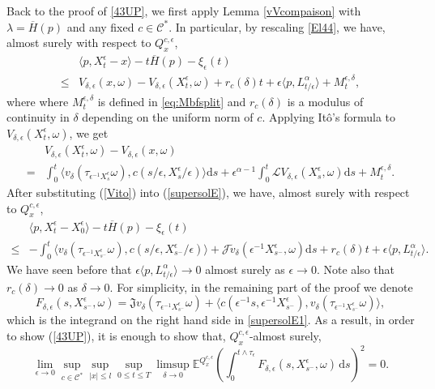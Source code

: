 \documentclass[11pt,reqno]{amsart}
\theoremstyle{definition}
\theoremstyle{remark}
\numberwithin{equation}{section}
\newcommand{\eps}{\epsilon}
\newcommand{\ol}{\overline}
\begin{document}
Back to the proof of \eqref{43UP}, we first apply Lemma \ref{vVcompaison} with $\lambda = \ol{H}(p)$ and any fixed $c\in \mathscr{C}^*$. In particular, by rescaling \eqref{El44},   we have, almost surely with respect to $Q^{c, \epsilon}_{x}$,
\begin{align}\label{supersolE}
   &  \langle p, X^{\epsilon}_{t} - x \rangle - t\overline{H}(p) - \xi_{\epsilon}(t) \nonumber\\
    \leq & V_{\delta,\epsilon}(x,\omega) - V_{\delta,\epsilon}(X^{\epsilon}_{t},\omega) + r_c(\delta)t + \epsilon \langle p, L^{\alpha}_{t/\eps} \rangle  + M^{\eps,\delta}_t,
\end{align}
where where $M^{\eps,\delta}_t$ is defined in \eqref{eq:Mbfsplit} and $r_{c}(\delta)$ is a modulus of continuity in $\delta$ depending on the uniform norm of $c$. 
Applying It\^{o}'s formula to $V_{\delta,\epsilon}(X^{\epsilon}_{t},\omega)$, we get
\begin{align}\label{Vito}
    &V_{\delta,\epsilon}(X^{\epsilon}_{t},\omega) - V_{\delta,\epsilon}(x,\omega) \nonumber \\
     =& \int_{0}^{ t} \langle v_{\delta}(\tau_{\epsilon^{-1}X^{\epsilon}_{s}}\omega), c(s/\epsilon, X^{\epsilon}_{s}/\epsilon) \rangle \mathrm{d}s  + \epsilon^{\alpha-1}\int_{0}^{t} \mathscr{L} V_{\delta,\epsilon}(X^{\epsilon}_{s},\omega) \mathrm{d}s + M^{\eps,\delta}_{t}.  
\end{align}
After substituting (\ref{Vito}) into (\ref{supersolE}), we have, almost surely with respect to $Q^{c, \epsilon}_{x}$,
\begin{align}\label{supersolE1}
    &   \langle p, X^{\epsilon}_t - X^{\epsilon}_0 \rangle \nonumber - t\overline{H}(p)  - \xi_{\epsilon}(t)  \nonumber \\
    \leq & -\int_{0}^{ t} \langle v_{\delta}(\tau_{\epsilon^{-1}X^{\epsilon}_{s^-}}\omega), c(s/\epsilon, X^{\epsilon}_{s^-}/\epsilon) \rangle + \mathscr{J}\widetilde{v}_{\delta}(\epsilon^{-1}X^{\epsilon}_{s^-},\omega) \mathrm{d}s  + r_{c}(\delta)t+ \epsilon \langle p, L^{\alpha}_{t/\eps}\rangle.
\end{align}
We have seen before that $\epsilon \langle p, L^{\alpha}_{t/\eps}\rangle \to 0$ almost surely as $\epsilon \to 0$. Note also that $r_{c}(\delta)\to 0$ as $\delta \to 0$. 
For simplicity, in the remaining part of the proof we denote
\begin{equation*}
    F_{\delta,\epsilon}(s,X^{\epsilon}_{s^-},\omega) = \mathfrak{J}v_{\delta}(\tau_{\epsilon^{-1}X^{\epsilon}_{s^-}}\omega) + \langle c(\epsilon^{-1}s, \epsilon^{-1}X^{\epsilon}_{s^-}), v_{\delta}(\tau_{\epsilon^{-1}X^{\epsilon}_{s^-}}\omega)\rangle,
\end{equation*}
which is the integrand on the right hand side in \eqref{supersolE1}. As a result, in order to show (\ref{43UP}), it is enough to show that, $Q^{c, \epsilon}_{x}$-almost surely,
\begin{equation}\label{Q0}
    \lim_{\epsilon\to0}\sup_{c\in\mathscr C^*}\sup_{|x|\leq l} \sup_{0\leq t\leq T}\limsup_{\delta\to0}\mathbb E^{Q_x^{c,\epsilon}}\left(\int_0^{t\wedge\tau_\epsilon}F_{\delta,\epsilon}(s,X_{s^-}^\epsilon,\omega)\,\mathrm ds\right)^2=0.
\end{equation}
\end{document}
